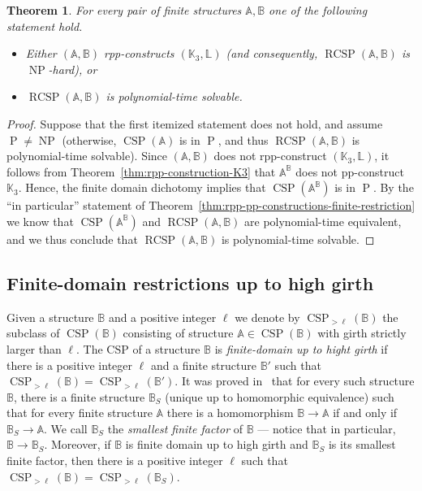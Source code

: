 \documentclass{article}
\newtheorem{theorem}{Theorem}
\theoremstyle{definition}
\theoremstyle{remark}
\DeclareMathOperator{\NP}{NP}
\DeclareMathOperator{\cP}{P}
\DeclareMathOperator{\CSP}{CSP}
\DeclareMathOperator{\RCSP}{RCSP}
\newcommand{\bA}{{\mathbb A}}
\newcommand{\bB}{{\mathbb B}}
\newcommand{\bK}{{\mathbb K}}
\newcommand{\bL}{{\mathbb L}}
\begin{document}
\begin{theorem}\label{thm:finite-RCSP-dichotomy}
    For every pair of finite structures $\bA,\bB$ one of the following statement hold.
    \begin{itemize}
        \item Either $(\bA,\bB)$ rpp-constructs $(\bK_3,\bL)$ (and consequently, 
        $\RCSP(\bA,\bB)$ is $\NP$-hard), or
        \item $\RCSP(\bA,\bB)$ is polynomial-time solvable. 
    \end{itemize}
\end{theorem}
\begin{proof}
   Suppose that the first itemized statement does not hold, and assume $\cP\neq\NP$
   (otherwise, $\CSP(\bA)$ is in $\cP$, and thus $\RCSP(\bA,\bB)$ is polynomial-time solvable).
   Since $(\bA,\bB)$ does not rpp-construct $(\bK_3,\bL)$, it follows from
   Theorem~\ref{thm:rpp-construction-K3} that $\bA^\bB$ does not pp-construct $\bK_3$.
   Hence, the finite domain dichotomy implies that $\CSP(\bA^\bB)$ is in $\cP$.
   By the ``in particular'' statement of Theorem~\ref{thm:rpp-pp-constructions-finite-restriction}
   we know that $\CSP(\bA^\bB)$ and $\RCSP(\bA,\bB)$ are polynomial-time equivalent,
   and we thus conclude that  $\RCSP(\bA,\bB)$ is polynomial-time solvable. 
\end{proof}




\subsection{Finite-domain restrictions up to high girth}
\label{subsect:finite-domain-up-to-high-girth}

Given a structure $\bB$ and a positive integer $\ell$ we denote by $\CSP_{>\ell}(\bB)$
the subclass of $\CSP(\bB)$ consisting of structure $\bA\in \CSP(\bB)$ with girth
strictly larger than $\ell$. The CSP of a structure $\bB$ is \emph{finite-domain up to hight girth}
if there is a positive integer $\ell$ and a finite structure $\bB'$ such that $\CSP_{>\ell}(\bB) = \CSP_{>\ell}(\bB')$.
It was proved in~\cite{guzmanGMSNP} that for every such structure $\bB$, there is a finite
structure $\bB_S$ (unique up to homomorphic equivalence) such that for every finite structure
$\bA$ there is a homomorphism $\bB\to \bA$ if and only if $\bB_S\to \bA$. We call $\bB_S$
the \emph{smallest finite factor} of $\bB$ --- notice that in particular, $\bB\to \bB_S$.
Moreover, if $\bB$ is finite domain up to high girth  and $\bB_S$ is its smallest finite factor,
then there is a positive integer $\ell$ such that
$\CSP_{>\ell}(\bB) =\CSP_{>\ell}(\bB_S)$\cite[Corollary 10]{guzmanGMSNP}.
\end{document}
